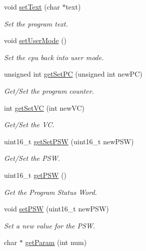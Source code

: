 \begin{DoxyCompactItemize}
\item 
void \hyperlink{classcCPU_acd957640be8abb7c0d8a24010ed0e737}{set\-Text} (char $\ast$text)
\begin{DoxyCompactList}\small\item\em \-Set the program text. \end{DoxyCompactList}\item 
void \hyperlink{classcCPU_a176eb207069b99c47ddec6b466d1a92b}{set\-User\-Mode} ()
\begin{DoxyCompactList}\small\item\em \-Set the cpu back into user mode. \end{DoxyCompactList}\item 
unsigned int \hyperlink{classcCPU_ab04938ac939d530e521181db6a52944f}{get\-Set\-P\-C} (unsigned int new\-P\-C)
\begin{DoxyCompactList}\small\item\em \-Get/\-Set the program counter. \end{DoxyCompactList}\item 
int \hyperlink{classcCPU_a2d593a0d3d66e532826db4754d5fc4d2}{get\-Set\-V\-C} (int new\-V\-C)
\begin{DoxyCompactList}\small\item\em \-Get/\-Set the \-V\-C. \end{DoxyCompactList}\item 
uint16\-\_\-t \hyperlink{classcCPU_a0b13774a76c6b04d760b8ff072c37a85}{get\-Set\-P\-S\-W} (uint16\-\_\-t new\-P\-S\-W)
\begin{DoxyCompactList}\small\item\em \-Get/\-Set the \-P\-S\-W. \end{DoxyCompactList}\item 
uint16\-\_\-t \hyperlink{classcCPU_ad485374a709476e2dfb847046d3d5215}{get\-P\-S\-W} ()
\begin{DoxyCompactList}\small\item\em \-Get the \-Program \-Status \-Word. \end{DoxyCompactList}\item 
void \hyperlink{classcCPU_adb6ad793398d28b5615dd1377a619084}{set\-P\-S\-W} (uint16\-\_\-t new\-P\-S\-W)
\begin{DoxyCompactList}\small\item\em \-Set a new value for the \-P\-S\-W. \end{DoxyCompactList}\item 
char $\ast$ \hyperlink{classcCPU_a891d9b77e1818ca247e9d76f4db99415}{get\-Param} (int num)

\end{DoxyCompactItemize}
